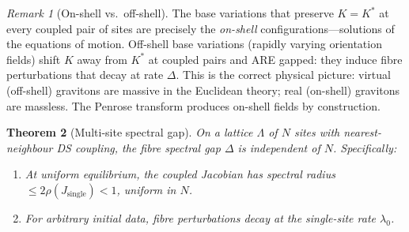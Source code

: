 \documentclass[11pt,a4paper]{article}
\newtheorem{theorem}{Theorem}[section]
\theoremstyle{definition}
\theoremstyle{remark}
\newtheorem{remark}[theorem]{Remark}
\begin{document}
\begin{remark}[On-shell vs.\ off-shell]
The base variations that preserve $K=K^*$ at every coupled pair of sites are precisely the \emph{on-shell} configurations---solutions of the equations of motion. Off-shell base variations (rapidly varying orientation fields) shift $K$ away from $K^*$ at coupled pairs and ARE gapped: they induce fibre perturbations that decay at rate $\Delta$. This is the correct physical picture: virtual (off-shell) gravitons are massive in the Euclidean theory; real (on-shell) gravitons are massless. The Penrose transform produces on-shell fields by construction.
\end{remark}

\begin{theorem}[Multi-site spectral gap]\label{thm:multisite}
On a lattice $\Lambda$ of $N$ sites with nearest-neighbour DS coupling, the fibre spectral gap $\Delta$ is independent of $N$. Specifically:
\begin{enumerate}[nosep]
\item At uniform equilibrium, the coupled Jacobian has spectral radius $\leq 2\rho(J_{\mathrm{single}})<1$, uniform in $N$.
\item For arbitrary initial data, fibre perturbations decay at the single-site rate $\lambda_0$.
\end{enumerate}
\end{theorem}
\end{document}
